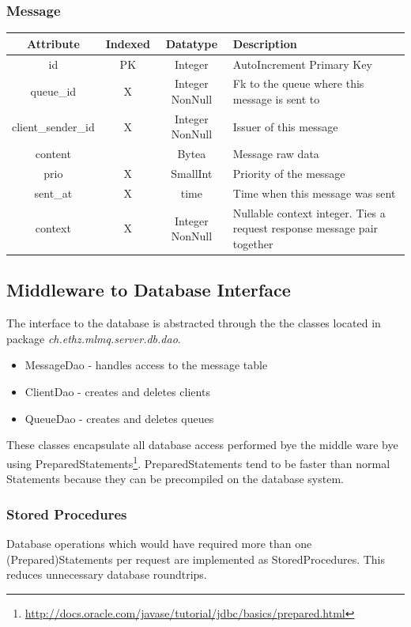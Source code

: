 \documentclass[a4paper]{article}
\begin{document}
\subsubsection{Message}
\begin{tabular}{|c|c|c|l|}
\hline 
\textbf{Attribute} & \textbf{Indexed} & \textbf{Datatype} & \textbf{Description} \\ 
\hline 
id & PK & Integer & AutoIncrement Primary Key \\ 
\hline 
queue\_id & X & Integer NonNull & Fk to the queue where this message is sent to\\ 
\hline 
client\_sender\_id & X & Integer NonNull & Issuer of this message \\ 
\hline 
content &  & Bytea & Message raw data \\ 
\hline 
prio & X & SmallInt & Priority of the message \\ 
\hline 
sent\_at & X & time & Time when this message was sent \\ 
\hline 
context & X & Integer NonNull & Nullable context integer. Ties a request response message pair together \\ 
\hline 
\end{tabular} 



\subsection{Middleware to Database Interface}

The interface to the database is abstracted through the the classes located in package \textit{ch.ethz.mlmq.server.db.dao}.

\begin{itemize}
\item MessageDao - handles access to the message table
\item ClientDao - creates and deletes clients
\item QueueDao - creates and deletes queues
\end{itemize}

These classes encapsulate all database access performed bye the middle ware bye using PreparedStatements\footnote{\url{http://docs.oracle.com/javase/tutorial/jdbc/basics/prepared.html}}. PreparedStatements tend to be faster than normal Statements because they can be precompiled on the database system.

\subsubsection{Stored Procedures}
Database operations which would have required more than one (Prepared)Statements per request are implemented as StoredProcedures. This reduces unnecessary database roundtrips.
\end{document}
